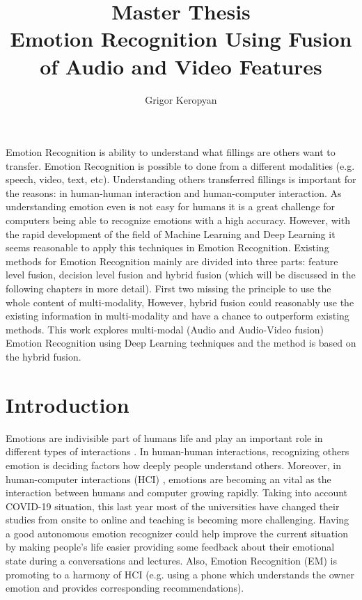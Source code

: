 \documentclass[oneside]{report}
\begin{document}
    \title{Master Thesis\\ Emotion Recognition Using Fusion of Audio and Video Features}
\author{Grigor Keropyan}


\beforepreface
{}
    Emotion Recognition is ability to understand what fillings are others want to transfer. Emotion Recognition is possible to done from a different modalities (e.g. speech, video, text, etc). Understanding others transferred fillings is important for the reasons: in human-human interaction and human-computer interaction. As understanding emotion even is not easy for humans it is a great challenge for computers being able to recognize emotions with a high accuracy. However, with the rapid development of the field of Machine Learning and Deep Learning it seems reasonable to apply this techniques in Emotion Recognition. 
    Existing methods for Emotion Recognition mainly are divided into three parts: feature level fusion, decision level fusion and hybrid fusion (which will be discussed in the following chapters in more detail). First two missing the principle to use the whole content of multi-modality, However, hybrid fusion could reasonably use the existing information in multi-modality and have a chance to outperform existing methods. 
    This work explores multi-modal (Audio and Audio-Video fusion) Emotion Recognition using Deep Learning techniques and the method is based on the hybrid fusion. 


\afterpreface
\chapter{Introduction}

    Emotions are indivisible part of humans life and play an important role in different types of interactions \cite{af_computing}. In human-human interactions, recognizing others emotion is deciding factors how deeply people understand others. Moreover, in human-computer interactions (HCI) \cite{hci_1, hci_2}, emotions are becoming an vital as the interaction between humans and computer growing rapidly. Taking into account COVID-19 situation, this last year most of the universities have changed their studies from onsite to online and teaching is becoming more challenging. Having a good autonomous emotion recognizer could help improve the current situation by making people's life easier providing some feedback about their emotional state during a conversations and lectures. Also, Emotion Recognition (EM) is promoting to a harmony of HCI \cite{google_survey} (e.g. using a phone which understands the owner emotion and provides corresponding recommendations). 
    
\end{document}
